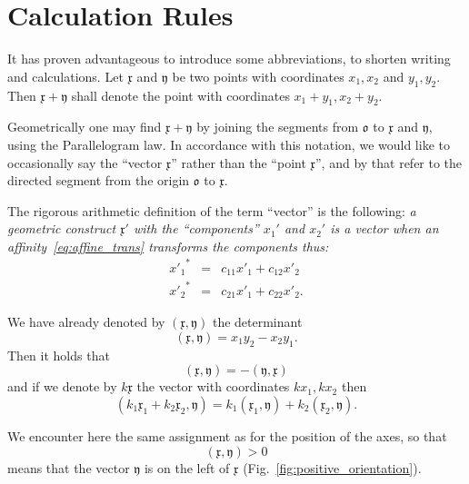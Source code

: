 \documentclass[11pt]{book} \usepackage{amssymb}
\newcommand{\myvec}[1]{\mathfrak{#1}}
\begin{document}
\section{Calculation Rules}
It has proven advantageous to introduce some abbreviations, to shorten
writing and calculations. Let $\myvec{x}$ and $\myvec{y}$ be two points with
coordinates $x_1,x_2$ and $y_1,y_2$. Then $\myvec{x}+\myvec{y}$ shall denote
the point with coordinates $x_1+y_1,x_2+y_2$. 

Geometrically one may find $\myvec{x}+\myvec{y}$ by joining the segments from
$\myvec{o}$ to $\myvec{x}$ and $\myvec{y}$, using the Parallelogram law. In
accordance with this notation, we would like to occasionally say the
``vector $\myvec{x}$'' rather than the ``point $\myvec{x}$'', and by that refer
to the directed segment from the origin $\myvec{o}$ to $\myvec{x}$.

The rigorous arithmetic definition of the term ``vector'' is the following:
{\em a geometric construct $\myvec{x}'$ with the ``components'' $x_1'$ and
$x_2'$ is a vector when an affinity~\eqref{eq:affine_trans} transforms the
components thus:}
\begin{equation}
  \label{eq:vector_def}
  \begin{array}{rcl}
    {x'_1}^* &=& c_{11}x'_1+c_{12}x'_2\\
    {x'_2}^* &=& c_{21}x'_1+c_{22}x'_2.
  \end{array}  
\end{equation}

We have already denoted by $(\myvec{x},\myvec{y})$ the determinant
\begin{equation}
  \label{eq:det_redefined}
  (\myvec{x},\myvec{y})=x_1y_2-x_2y_1.
\end{equation}
Then it holds that
\begin{equation}
  \label{eq:det_antisymmetric}
  (\myvec{x},\myvec{y})=-(\myvec{y},\myvec{x})
\end{equation}
and if we denote by $k\myvec{x}$ the vector with coordinates $kx_1,kx_2$ then
\begin{equation}
  \label{eq:det_bilinear}
  (k_1\myvec{x}_1+k_2\myvec{x}_2,\myvec{y})=k_1(\myvec{x}_1,\myvec{y})+k_2(\myvec{x}_2,\myvec{y}).
\end{equation}

We encounter here the same assignment as for the position of the axes, so that
\begin{equation}
  (\myvec{x},\myvec{y}) > 0
\end{equation}
means that the vector $\myvec{y}$ is on the left of $\myvec{x}$ 
(Fig.~\ref{fig:positive_orientation}).
\end{document}
